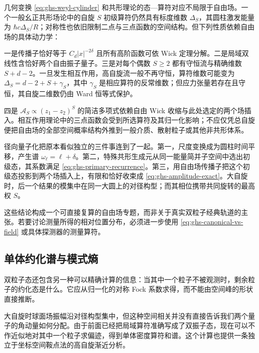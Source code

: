 几何变换 \cref{eq:ghs-weyl-cylinder} 和共形理论的态—算符对应不局限于自由场。一个一般幺正共形场论中的自旋 $S$ 初级算符仍然具有标度维数 $\Delta_{S}$，其圆柱激发能量为 $\hbar c\Delta_S/R$；对称性也依旧限制二点与三点函数的空间结构。但下列性质依赖自由场的具体动力学：

一是传播子恰好等于 $C_d|x|^{-2\delta}$ 且所有高阶函数可依 Wick 定理分解。二是局域双线性含恰好两个自由振子量子。三是对每个偶数 $S\ge2$ 都有守恒流与精确维数 $S+d-2$。一旦发生相互作用，高自旋流一般不再守恒，算符维数可能变为 $\Delta_S=d-2+S+\gamma_S$，其中 $\gamma_S$ 是相应算符的反常维数；但应力张量若存在且守恒，其自旋二维数仍由 Ward 恒等式保护。

四是 $\mathcal A_S\propto(z_1-z_2)^S$ 的简洁多项式依赖自由 Wick 收缩与此处选定的两个场插入。相互作用理论中的三点函数会受到所选算符及其归一化影响；不应仅凭总自旋便把自由场的全部空间概率结构外推到一般介质、散射粒子或其他非共形体系。


径向量子化把原本看似独立的三件事连到了一起。第一，尺度变换成为圆柱时间平移，产生谱 $\omega_\ell=\ell+\delta$。第二，特殊共形生成元从同一能量简并子空间中选出初级态，其系数满足 \cref{eq:ghs-primary-recurrence}。第三，用自由场传播子把这个初级态投影到两个场插入上，有限和恰好收束成 \cref{eq:ghs-amplitude-exact}。大自旋时，后一个结果的模集中在同一大圆上的对径构型；而其相位携带共同旋转的最高权 $S$。

这些结论构成一个可直接复算的自由场专题，而非关于真实双粒子经典轨道的主张。若要讨论测量所得的相对位置分布，必须进一步使用 \cref{eq:ghs-canonical-vs-field} 或具体探测器的测量算符。


\subsection{单体约化谱与模式熵}

双粒子态还包含另一种可以精确计算的信息：当其中一个粒子不被观测时，剩余粒子的约化态是什么。它应从归一化的对称 Fock 系数求得，而不能由空间峰的形状直接推断。


大自旋时球面场振幅沿对径构型集中，但这种空间相关并没有直接告诉我们两个量子的角动量如何分配。由于前面已经把局域算符准确写成了双振子态，现在可以不作近似地对其中一个粒子求偏迹，得到单体密度算符和谱。这个计算也提供一条独立于坐标空间鞍点法的高自旋渐近分析。


